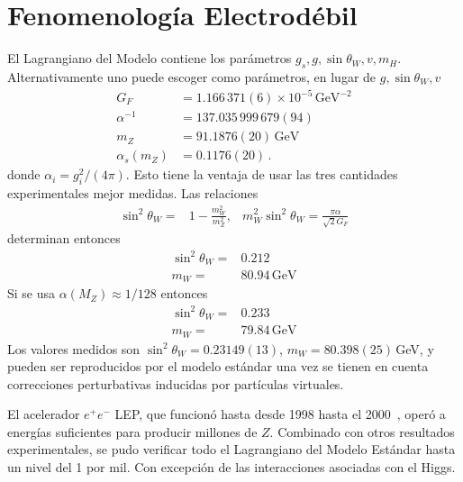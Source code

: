 \section{Fenomenología Electrodébil}
\label{sec:fenom-electr}
El Lagrangiano del Modelo contiene los parámetros $g_s,g,\sin\theta_W,v,m_H$. Alternativamente uno puede escoger como parámetros, en lugar de $g,\sin\theta_W,v$ \cite{a}
\begin{align}
  \label{eq:233qft}
  G_F&=1.166\,371(6)\times 10^{-5}\,\text{GeV}^{-2}\nonumber\\
  \alpha^{-1}&=137.035\,999\,679(94)\nonumber\\
  m_Z&=91.1876(20)\,\text{GeV}\nonumber\\
  \alpha_s(m_Z)&=0.1176(20)\,.
\end{align}
donde $\alpha_i=g_i^2/(4\pi)$. 
Esto tiene la ventaja de usar las tres cantidades experimentales mejor medidas. Las relaciones
\begin{align}
  \sin^2\theta_W=&1-\frac{m_W^2}{m_Z^2},&m_W^2\sin^2\theta_W=\frac{\pi\alpha}{\sqrt{2}G_F}
\end{align}
determinan entonces
\begin{align}
  \sin^2\theta_W=&0.212\nonumber\\
  m_W=&80.94\,\text{GeV}
\end{align}
Si se usa $\alpha(M_Z)\approx1/128$ entonces
\begin{align}
   \sin^2\theta_W=&0.233\nonumber\\
  m_W=&79.84\,\text{GeV}
\end{align}
Los valores medidos son $\sin^2\theta_W=0.23149(13)$, $m_W=80.398(25)\,$GeV, y pueden ser reproducidos por el modelo estándar una vez se tienen en cuenta correcciones perturbativas inducidas por partículas virtuales.

El acelerador $e^+e^-$ LEP, que funcionó hasta desde 1998 hasta el 2000~\cite{LEP}, operó a energías suficientes para producir millones de $Z$. Combinado con otros resultados experimentales, se pudo verificar todo el Lagrangiano del Modelo Estándar hasta un nivel del 1 por mil. Con excepción de las interacciones asociadas con el Higgs. 

